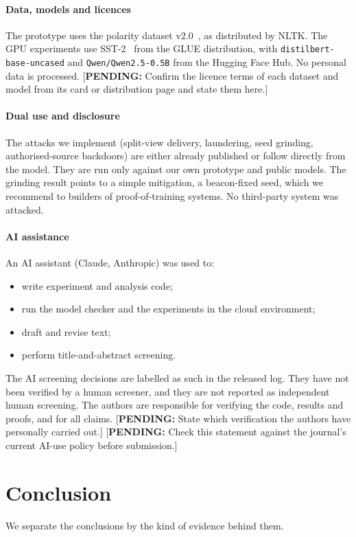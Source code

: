 \documentclass[journal,10pt]{IEEEtran}
\theoremstyle{definition}
\newcommand{\pending}[1]{{\color{red!70!black}[\textbf{PENDING:} #1]}}
\begin{document}
\paragraph{Data, models and licences}
The prototype uses the polarity dataset v2.0~\cite{pang2004sentimental}, as distributed by
NLTK. The GPU experiments use SST-2~\cite{socher2013sst} from the GLUE distribution, with
\texttt{distilbert-base-uncased} and \texttt{Qwen/Qwen2.5-0.5B} from the Hugging Face Hub. No
personal data is processed. \pending{Confirm the licence terms of each dataset and model from
its card or distribution page and state them here.}

\paragraph{Dual use and disclosure}
The attacks we implement (split-view delivery, laundering, seed grinding, authorised-source
backdoors) are either already published or follow directly from the model. They are run only
against our own prototype and public models. The grinding result points to a simple
mitigation, a beacon-fixed seed, which we recommend to builders of proof-of-training systems.
No third-party system was attacked.

\paragraph{AI assistance}
An AI assistant (Claude, Anthropic) was used to:
\begin{itemize}
\item write experiment and analysis code;
\item run the model checker and the experiments in the cloud environment;
\item draft and revise text;
\item perform title-and-abstract screening.
\end{itemize}
The AI screening decisions are labelled as such in the released log. They have not been
verified by a human screener, and they are not reported as independent human screening. The
authors are responsible for verifying the code, results and proofs, and for all claims.
\pending{State which verification the authors have personally carried out.} \pending{Check this statement against the journal's current AI-use policy before
submission.}

\section{Conclusion}
We separate the conclusions by the kind of evidence behind them.
\end{document}
